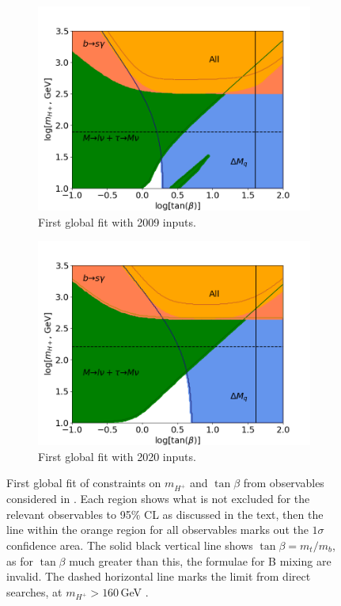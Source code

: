 \documentclass[a4paper,12pt]{article}
\begin{document}
\begin{figure}[ht]
    \centering
    \begin{subfigure}[b]{0.48\textwidth}
        \includegraphics[width=\textwidth]{global08.png}
        \caption{\label{subfig:glob08}First global fit with 2009 inputs.}
    \end{subfigure}
    \begin{subfigure}[b]{0.48\textwidth}
        \includegraphics[width=\textwidth]{../global/global_test_min.png}
        \caption{\label{subfig:glob11}First global fit with 2020 inputs.}
    \end{subfigure}
    \caption{\label{fig:glob1} First global fit of constraints on $m_{H^+}$ and $\tan\beta$ from observables considered in \cite{desc}. 
    Each region shows what is not excluded for the relevant observables to 95\% CL as discussed in the text, then the line within the orange region for all observables marks out the $1\sigma$ confidence area. 
    The solid black vertical line shows $\tan\beta=m_t/m_b$, as for $\tan\beta$ much greater than this, the formulae for B mixing are invalid. 
    The dashed horizontal line marks the limit from direct searches, at $m_{H^+}>160\,$GeV \cite{dirhp}.}
\end{figure}
\end{document}
